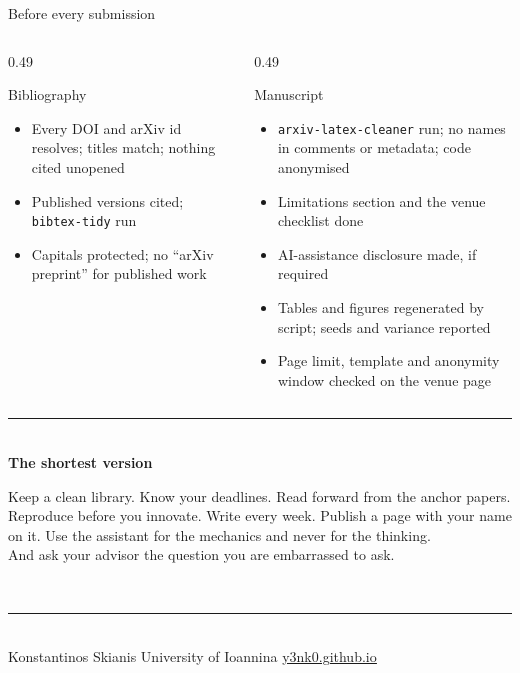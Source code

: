 \documentclass[aspectratio=169,11pt]{beamer}
\newcommand{\code}[1]{\texttt{\small #1}}
\newcommand{\lnk}[2]{\href{#1}{\color{brandlight}\underline{#2}}}
\begin{document}
\begin{frame}{Before every submission}
\begin{columns}[T]
\begin{column}{0.49\textwidth}
\begin{block}{Bibliography}
\footnotesize
\begin{itemize}
  \item Every DOI and arXiv id resolves; titles match; nothing cited unopened
  \item Published versions cited; \code{bibtex-tidy} run
  \item Capitals protected; no ``arXiv preprint'' for published work
\end{itemize}
\end{block}
\end{column}
\begin{column}{0.49\textwidth}
\begin{block}{Manuscript}
\footnotesize
\begin{itemize}
  \item \code{arxiv-latex-cleaner} run; no names in comments or metadata;
        code anonymised
  \item Limitations section and the venue checklist done
  \item AI-assistance disclosure made, if required
  \item Tables and figures regenerated by script; seeds and variance reported
  \item Page limit, template and anonymity window checked on the venue page
\end{itemize}
\end{block}
\end{column}
\end{columns}
\end{frame}

\begin{frame}
\vfill
\centering
{\color{brandlight}\rule{0.8\textwidth}{1.4pt}}\\[10pt]
{\large\bfseries\color{brand}The shortest version}\\[10pt]
\begin{minipage}{0.8\textwidth}\centering
Keep a clean library. Know your deadlines. Read forward from the anchor papers.
Reproduce before you innovate. Write every week. Publish a page with your name
on it. Use the assistant for the mechanics and never for the thinking.\\[6pt]
And ask your advisor the question you are embarrassed to ask.
\end{minipage}\\[12pt]
{\color{brandlight}\rule{0.8\textwidth}{1.4pt}}\\[14pt]
{\footnotesize\color{mutegray}Konstantinos Skianis \quad\textbullet\quad
University of Ioannina \quad\textbullet\quad
\lnk{https://y3nk0.github.io}{y3nk0.github.io}}
\vfill
\end{frame}
\end{document}
